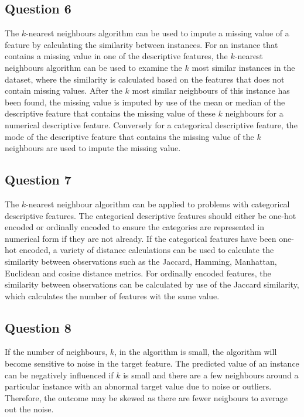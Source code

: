 \documentclass[10pt]{article}
\begin{document}
\subsection*{Question 6}

The $k$-nearest neighbours algorithm can be used to impute a missing value of a feature by calculating the
similarity between instances. For an instance that contains a missing value in one of the descriptive
features, the $k$-nearest neighbours algorithm can be used to examine the $k$ most similar instances
in the dataset, where the similarity is calculated based on the features that does not contain missing values.
After the $k$ most similar neighbours of this instance has been found, the missing value is imputed by use of
the mean or median of the descriptive feature that contains the missing value of these $k$ neighbours for a numerical
descriptive feature. Conversely for a categorical descriptive feature, the mode of the descriptive feature that contains
the missing value of the $k$ neighbours are used to impute the missing value.

\subsection*{Question 7}

The $k$-nearest neighbour algorithm can be applied to problems with categorical descriptive features.
The categorical descriptive features should either be one-hot encoded or ordinally encoded to ensure the
categories are represented in numerical form if they are not already. If the categorical features have been
one-hot encoded, a variety of distance calculations can be used to calculate the similarity between
observations such as the Jaccard, Hamming, Manhattan, Euclidean and cosine distance metrics. For
ordinally encoded features, the similarity between observations can be calculated by use of the Jaccard
similarity, which calculates the number of features wit the same value.

\subsection*{Question 8}

If the number of neighbours, $k$, in the algorithm is small, the algorithm will become sensitive to noise in the
target feature. The predicted value of an instance can be negatively influenced if $k$ is small and there are
a few neighbours around a particular instance with an abnormal target value due to noise or outliers. Therefore,
the outcome may be skewed as there are fewer neigbours to average out the noise.
\end{document}

